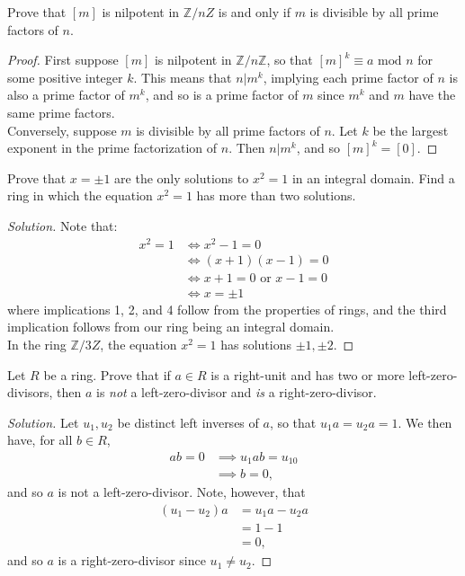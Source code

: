 \documentclass[12pt]{article}
\newenvironment{problem}[2][Problem]{\begin{trivlist}
\item[\hskip \labelsep {\bfseries #1}\hskip \labelsep {\bfseries #2.}]}{\end{trivlist}}
\newenvironment{solution}
  {\renewcommand\qedsymbol{$\blacksquare$}\begin{proof}[Solution]}
{\end{proof}}
\theoremstyle{remark}
\begin{document}
\begin{problem}{1.7}
  Prove that $[m]$ is nilpotent in $\mathbb{Z}/n{Z}$ is and only if $m$ is divisible
  by all prime factors of $n$.
\end{problem}
\begin{proof}
  First suppose $[m]$ is nilpotent in $\mathbb{Z}/n\mathbb{Z}$, so that 
  $[m]^k \equiv a \text{ mod } n$ for some positive integer $k$.
  This means that $n | m^k$, implying each prime factor of $n$ is also a 
  prime factor of $m^k$, and so is a prime factor of $m$ since $m^k$ and $m$ 
  have the same prime factors.\\
  \indent Conversely, suppose $m$ is divisible by all prime factors of $n$.
  Let $k$ be the largest exponent in the prime factorization of $n$.
  Then $n | m^k$, and so $[m]^k = [0]$.
\end{proof}

\begin{problem}{1.8}
  Prove that $x=\pm1$ are the only solutions to $x^2=1$ in an integral domain.
  Find a ring in which the equation $x^2=1$ has more than two solutions.
\end{problem}
\begin{solution}
  Note that:
    \begin{align*}
      x^2 = 1 & \Leftrightarrow x^2 - 1 = 0 \\
              & \Leftrightarrow (x+1)(x-1) = 0 \\
              & \Leftrightarrow x+1 = 0 \text{ or } x-1 = 0 \\
              & \Leftrightarrow x = \pm1
    \end{align*}
    where implications 1, 2, and 4 follow from the properties of rings, 
    and the third implication follows from our ring being an integral domain.\\
    \indent In the ring $\mathbb{Z}/3{Z}$, the equation $x^2=1$ has solutions $\pm1,\pm2$.
\end{solution}

\begin{problem}{10}
  Let $R$ be a ring.
  Prove that if $a\in R$ is a right-unit and has two or more left-zero-divisors, 
  then $a$ is \textit{not} a left-zero-divisor and \textit{is} a right-zero-divisor.
\end{problem}
\begin{solution}
  Let $u_1,u_2$ be distinct left inverses of $a$, so that $u_1a=u_2a=1$.
  We then have, for all $b\in R$,
    \begin{align*}
      ab=0 &\implies u_1ab=u_10\\
           &\implies b=0,
    \end{align*}
  and so $a$ is not a left-zero-divisor.
  Note, however, that 
    \begin{align*}
      (u_1-u_2)a &= u_1a-u_2a\\
                 &= 1-1\\
                 &= 0,
    \end{align*}
    and so $a$ is a right-zero-divisor since $u_1\neq u_2$.
\end{solution}
\end{document}
